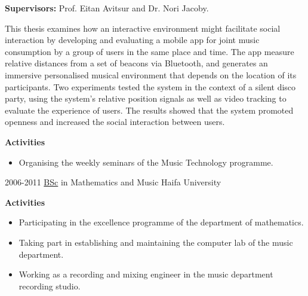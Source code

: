 \documentclass[]{friggeri-cv}
\begin{document}
\begin{entrylist}
{    \textbf{Supervisors:} Prof. Eitan Avitsur and Dr. Nori Jacoby.

    This thesis examines how an interactive environment might facilitate social interaction by developing and evaluating a mobile app for joint music consumption by a group of users in the same place and time.
    The app measure relative distances from a set of beacons via Bluetooth, and generates an immersive personalised musical environment that depends on the location of its participants.
    Two experiments tested the system in the context of a silent disco party, using the system's relative position signals as well as video tracking to evaluate the experience of users.
    The results showed that the system promoted openness and increased the social interaction between users.

    \textbf{Activities}
    \begin{itemize}
      \item
        Organising the weekly seminars of the Music Technology programme.
    \end{itemize}
  }

  \entry
  {2006-2011}
  {\href{http://www.tomgurion.me/pdfs/BSc.pdf}{BSc} in Mathematics and Music}
  {Haifa University}
  {
    \textbf{Activities}
    \begin{itemize}
      \item
        Participating in the excellence programme of the department of mathematics.
      \item
        Taking part in establishing and maintaining the computer lab of the music department.
      \item
        Working as a recording and mixing engineer in the music department recording studio.
    \end{itemize}
  }

\end{entrylist}
\end{document}
